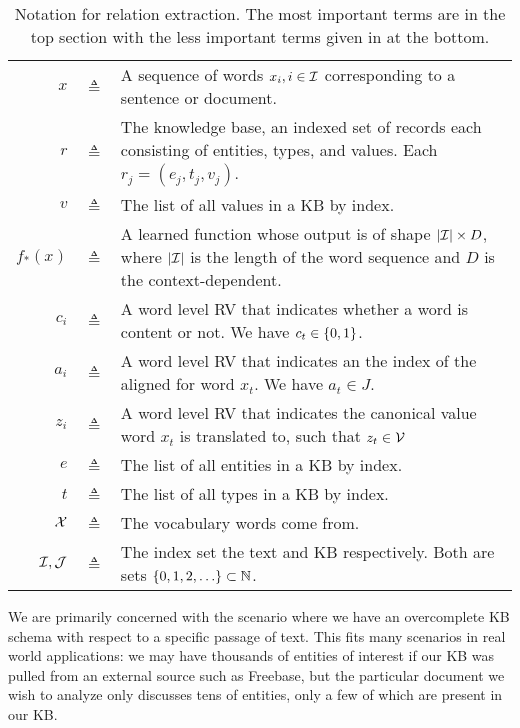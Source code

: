 \documentclass[12pt]{article}
\begin{document}
\begin{table}[htbp]\caption{Notation for relation extraction.
The most important terms are in the top section
with the less important terms given in at the bottom.}
\centering %
\begin{tabular}{r c p{10cm}}
\toprule
$x$ & $\triangleq$ & A sequence of words $x_i, i \in \mathcal{I}$
    corresponding to a sentence or document.\\
$r$ & $\triangleq$ & The knowledge base,
    an indexed set of records each consisting of entities, types, and values.
    Each $r_j = (e_j, t_j, v_j)$.\\
$v$ & $\triangleq$ & The list of all values in a KB by index.\\
$f_*(x)$ & $\triangleq$ & A learned function whose output is of shape $|\mathcal{I}| \times D$,
    where $|\mathcal{I}|$ is the length of the word sequence and $D$ is the context-dependent.\\
$c_i$ & $\triangleq$ & A word level RV that indicates whether a word is content or not.
    We have $c_t \in \left\{0,1\right\}$.\\
$a_i$ & $\triangleq$ & A word level RV that indicates an the index of the aligned
    for word $x_t$. We have $a_t \in J$.\\
$z_i$ & $\triangleq$ & A word level RV that indicates the canonical value 
word $x_t$ is translated to, such that $z_t \in \mathcal{V}$\\
\midrule
$e$ & $\triangleq$ & The list of all entities in a KB by index.\\
$t$ & $\triangleq$ & The list of all types in a KB by index.\\
$\mathcal{X}$ & $\triangleq$ & The vocabulary words come from.\\
$\mathcal{I},\mathcal{J}$ & $\triangleq$ & The index set the text and KB respectively.
    Both are sets $\left\{0,1,2,\ldots\right\}\subset \mathbb{N}$.\\
\bottomrule
\end{tabular}
\label{tab:TableOfNotationForMyResearch}
\end{table}

We are primarily concerned with the scenario where we have an overcomplete KB schema with
respect to a specific passage of text.
This fits many scenarios in real world applications:
we may have thousands of entities of interest if our KB was pulled from an 
external source such as Freebase,
but the particular document we wish to analyze only discusses tens of entities,
only a few of which are present in our KB.
\end{document}
